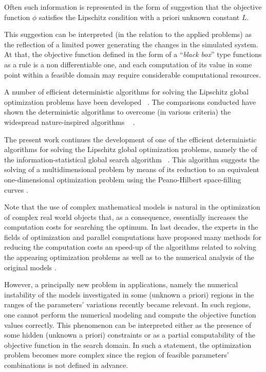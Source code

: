 \documentclass[runningheads]{llncs}
\begin{document}
Often such information is represented in the form of suggestion that the objective function $\phi$ satisfies the Lipschitz condition with a priori unknown constant $L$.

This suggestion can be interpreted (in the relation to the applied problems) as the reflection of a limited power generating the changes in the simulated system. At that, the objective function defined in the form of a ``\textit{black box}'' type functions as a rule is a non differentiable one, and each computation of its value in some point within a feasible domain may require considerable computational resources.

A number of efficient deterministic algorithms for solving the Lipschitz global optimization problems have been developed ~\cite{Jones2009,Birect2020,Sergeyev2017}. The comparisons conducted have shown the deterministic algorithms to overcome (in various criteria) the widespread nature-inspired algorithms ~\cite{Liberti2005,Sergeyev2018,Sovrasov2019} .

The present work continues the development of one of the efficient deterministic algorithms for solving the Lipschitz global optimization problems, namely the of the information-statistical global search algorithm ~\cite{indexMethod,strongin1978,Strongin2000}. This algorithm suggests the solving of a multidimensional problem by means of its reduction to an equivalent one-dimensional optimization problem using the Peano-Hilbert space-filling curves \cite{Sergeyev2013}. 

Note that the use of complex mathematical models is natural in the optimization of complex real world objects that, as a consequence, essentially increases the computation costs for searching the optimum. In last decades, the experts in the fields of optimization and parallel computations have proposed many methods for reducing the computation costs an speed-up of the algorithms related to solving the appearing optimization problems \cite{Kvasov2013}  as well as to the numerical analysis of the original models \cite{Dongarra2022,Duwe2020}.

However, a principally new problem in applications, namely the numerical instability of the models investigated in some (unknown a priori) regions in the ranges of the parameters’ variations recently became relevant. In such regions, one cannot perform the numerical modeling and compute the objective function values correctly. This phenomenon can be interpreted either as the presence of some hidden (unknown a priori) constraints or as a partial computability of the objective function in the search domain. In such a statement, the optimization problem becomes more complex since the region of feasible parameters’ combinations is not defined in advance.
\end{document}
